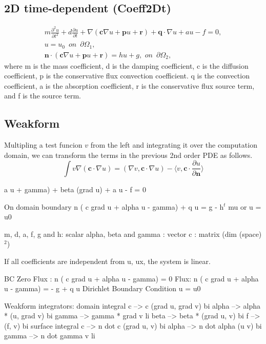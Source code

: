 \documentclass[11pt,a4paper,final]{report}
\begin{document}
 

 
  \subsection{2D time-dependent (Coeff2Dt)}
  \begin{align}
  m\frac{\partial^2 u}{\partial t^2} +   d\frac{\partial u}{\partial t} + \nabla (\mathbf{c} \nabla u + \mathbf{p}u + \mathbf{r}) + \mathbf{q} \cdot \nabla u + au - f = 0, 
  \\  
  u = u_{0} \,\,\,on\,\,\,\partial \Omega_{1},
  \\
 \mathbf{n}\cdot (\mathbf{c} \nabla u + \mathbf{p}u + \mathbf{r}) = hu + g,\,\,on\,\,\,\partial \Omega_{2},
  \end{align}
where m is the mass coefficient, d is the damping coefficient, c is the diffusion coefficient, p is the conservative flux convection coefficient. q is the convection coefficient,  a is the absorption coefficient, r is the conservative flux source term, and f is the source term.

 \subsection{Weakform}
  Multipling a test funcion $v$ from the left and integrating it over the computation domain,  we can transform the terms in the previous 2nd order PDE as follows.
  \begin{equation}
 \int v \nabla (\mathbf{c} \cdot \nabla u) = (\nabla v,\mathbf{c} \cdot \nabla u) - \langle v, \mathbf{c} \cdot \frac{\partial u}{\partial \mathbf{n}} \rangle
  \end{equation}
  
  a u + gamma) 
              + beta (grad u) + a u - f = 0

  On domain boundary
     n ( c grad u + alpha u - gamma) + q u = g - h$^t$ mu
       or 
     u = u0  

    m, d, a, f, g and h: scalar
    alpha, beta and gamma : vector
    c  : matrix (dim (space) $^2$)

    If all coefficients are independent from u, ux,
    the system is linear.

    BC
     Zero Flux : 
        n ( c grad u + alpha u - gamma) = 0
     Flux: 
        n ( c grad u + alpha u - gamma) = - g + q u
     Dirichlet Boundary Condition
        u = u0

  Weakform integrators:
    domain integral
       c     -->  c (grad u, grad v)     bi
       alpha -->  alpha * (u, grad v)    bi
       gamma -->  gamma * grad v         li
       beta  -->  beta * (grad u, v)     bi
       f     -->  (f, v)                 bi
    surface integral
       c     -->   n dot c (grad u, v)   bi
       alpha -->   n dot alpha  (u v)    bi
       gamma -->   n dot gamma   v       li
 
\end{document}
